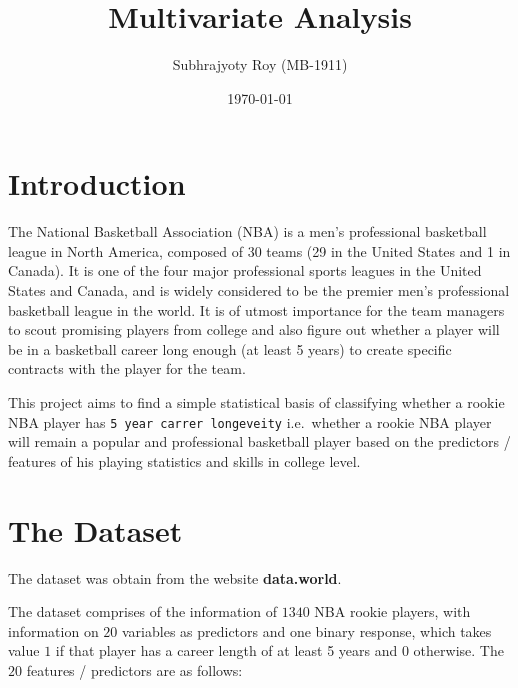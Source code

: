 \documentclass[10pt]{article}
\title{Multivariate Analysis}
\author{Subhrajyoty Roy (MB-1911)}
\date{\today}
\begin{document}
\maketitle

\section{Introduction}

The National Basketball Association (NBA) is a men's professional
basketball league in North America, composed of 30 teams (29 in the
United States and 1 in Canada). It is one of the four major professional
sports leagues in the United States and Canada, and is widely considered
to be the premier men's professional basketball league in the world. It
is of utmost importance for the team managers to scout promising players
from college and also figure out whether a player will be in a
basketball career long enough (at least 5 years) to create specific
contracts with the player for the team.

This project aims to find a simple statistical basis of classifying
whether a rookie NBA player has \texttt{5\ year\ carrer\ longeveity}
i.e.~whether a rookie NBA player will remain a popular and professional
basketball player based on the predictors / features of his playing
statistics and skills in college level.

\section{The Dataset}\label{the-dataset}

The dataset was obtain from the website \textbf{data.world}.

The dataset comprises of the information of \(1340\) NBA rookie players,
with information on \(20\) variables as predictors and one binary
response, which takes value \(1\) if that player has a career length of
at least 5 years and \(0\) otherwise. The \(20\) features / predictors
are as follows:
\end{document}
